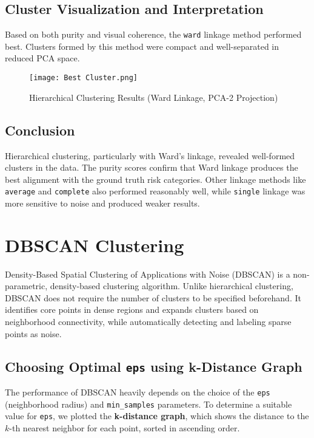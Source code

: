 \documentclass{article}
\begin{document}
\subsection{Cluster Visualization and Interpretation}

Based on both purity and visual coherence, the \texttt{ward} linkage method performed best. Clusters formed by this method were compact and well-separated in reduced PCA space.

\begin{figure}[h!]
    \centering
    \texttt{[image: Best Cluster.png]}
    \caption{Hierarchical Clustering Results (Ward Linkage, PCA-2 Projection)}
\end{figure}

\subsection*{Conclusion}

Hierarchical clustering, particularly with Ward's linkage, revealed well-formed clusters in the data. The purity scores confirm that Ward linkage produces the best alignment with the ground truth risk categories. Other linkage methods like \texttt{average} and \texttt{complete} also performed reasonably well, while \texttt{single} linkage was more sensitive to noise and produced weaker results.
\section{DBSCAN Clustering}

Density-Based Spatial Clustering of Applications with Noise (DBSCAN) is a non-parametric, density-based clustering algorithm. Unlike hierarchical clustering, DBSCAN does not require the number of clusters to be specified beforehand. It identifies core points in dense regions and expands clusters based on neighborhood connectivity, while automatically detecting and labeling sparse points as noise.

\subsection{Choosing Optimal \texttt{eps} using k-Distance Graph}

The performance of DBSCAN heavily depends on the choice of the \texttt{eps} (neighborhood radius) and \texttt{min\_samples} parameters. To determine a suitable value for \texttt{eps}, we plotted the \textbf{k-distance graph}, which shows the distance to the $k$-th nearest neighbor for each point, sorted in ascending order.
\end{document}
